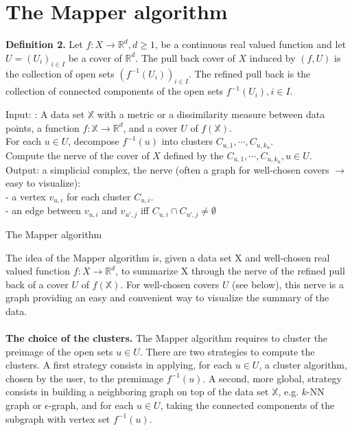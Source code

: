 \section{The Mapper algorithm}
\textbf{Definition 2.} Let $f: X \rightarrow \mathbb{R}^d, d\geq 1$, be a continuous real valued function and let $U = (U_i)_{i\in I}$ be a cover of $\mathbb{R}^d$. The pull back cover of $X$ induced by $(f, U)$ is the collection of open sets $(f^{-1}(U_i))_{i\in I}$. The refined pull back is the collection of connected components of the open sets $f^{-1}(U_i), i \in I$.
\begin{algorithm}[H]
\SetAlgoLined
Input: : A data set $\mathbb{X}$ with a metric or a dissimilarity measure between data points, a function $f: \mathbb{X} \rightarrow \mathbb{R}^d$, and a cover $U$ of $f(\mathbb{X})$.\\
For each $u \in U$, decompose $f^{-1}(u)$ into clusters $C_{u,1}, \cdots, C_{u, k_u}$.\\
Compute the nerve of the cover of $X$ defined by the $C_{u,1},\cdots, C_{u, k_u}, u \in U$.\\
Output: a simplicial complex, the nerve (often a graph for well-chosen covers $\rightarrow$ easy to visualize):\\
- a vertex $v_{u,i}$ for each cluster $C_{u,i}$.\\
- an edge between $v_{u,i}$ and $v_{u',j}$ iff $C_{u,i} \cap C_{u',j} \neq \emptyset$
 \caption{The Mapper algorithm}
\end{algorithm}
\noindent The idea of the Mapper algorithm is, given a data set X and well-chosen real valued function $f: X \rightarrow \mathbb{R}^d$, to summarize X through the nerve of the refined pull back of a cover $U$ of $f(\mathbb{X})$.
For well-chosen covers $U$ (see below), this nerve is a graph providing an easy and convenient way to visualize the summary of the data.\\\\
\textbf{The choice of the clusters.} The Mapper algorithm requires to cluster the preimage of the open sets $u \in U$. There are two strategies to compute the clusters. A first strategy consists in applying, for each $u \in U$, a cluster algorithm, chosen by the user, to the premimage $f^{-1}(u)$. A second, more global, strategy consists in building a neighboring graph on top of the data set $\mathbb{X}$, e.g. $k$-NN graph or $\epsilon$-graph, and for each $u \in U$, taking the connected components of the subgraph with vertex set $f^{-1}(u)$.